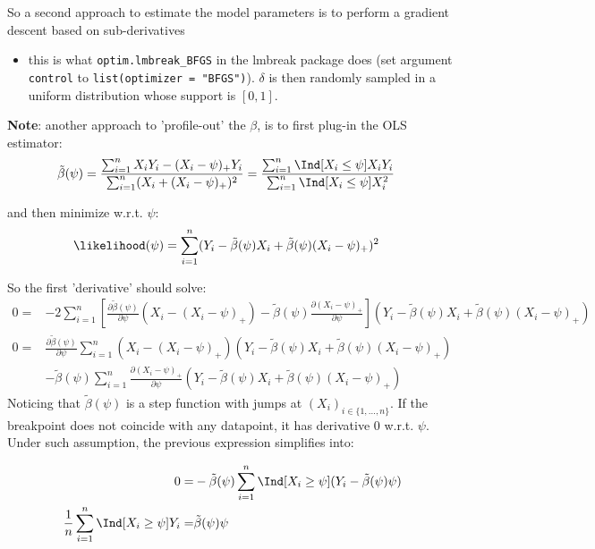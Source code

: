 \documentclass[12pt]{article}
\begin{document}
\bigskip

So a second approach to estimate the model parameters is to perform a
gradient descent based on sub-derivatives
\begin{itemize}
\item this is what \texttt{optim.lmbreak\_BFGS} in the lmbreak package does (set
argument \texttt{control} to \texttt{list(optimizer = "BFGS")}). \(\delta\) is then randomly
sampled in a uniform distribution whose support is \([0,1]\).
\end{itemize}

\clearpage


\noindent \textbf{Note}: another approach to 'profile-out' the \(\beta\), is to first
 plug-in the OLS estimator:
\begin{align*}
\tilde{\beta}(\psi) &= \frac{\sum_{i=1}^n X_i Y_i - (X_i - \psi)_+ Y_i}{\sum_{i=1}^n (X_i + (X_i - \psi)_+)^2} = \frac{\sum_{i=1}^n \Ind[X_i \leq \psi] X_i Y_i}{\sum_{i=1}^n \Ind[X_i \leq \psi] X^2_i} 
\end{align*}

and then minimize w.r.t. \(\psi\):
\begin{align*}
\likelihood(\psi) &= \sum_{i=1}^n (Y_i - \tilde{\beta}(\psi) X_i + \tilde{\beta}(\psi) (X_i - \psi)_+)^2
\end{align*}

So the first 'derivative' should solve:
\begin{align*}
0 =& -2 \sum_{i=1}^n \left[
  \frac{\partial \tilde{\beta}(\psi)}{\partial \psi} (X_i - (X_i - \psi)_+)
- \tilde{\beta}(\psi)\frac{\partial (X_i - \psi)_+}{\partial \psi}\right]
(Y_i - \tilde{\beta}(\psi) X_i + \tilde{\beta}(\psi)(X_i - \psi)_+ ) \\
0 =& \frac{\partial \tilde{\beta}(\psi)}{\partial \psi} \sum_{i=1}^n (X_i - (X_i - \psi)_+)(Y_i - \tilde{\beta}(\psi) X_i + \tilde{\beta}(\psi)(X_i - \psi)_+ ) \\
& - \tilde{\beta}(\psi)\sum_{i=1}^n\frac{\partial (X_i - \psi)_+}{\partial \psi}(Y_i - \tilde{\beta}(\psi) X_i + \tilde{\beta}(\psi)(X_i - \psi)_+ ) 
\end{align*}
Noticing that \(\tilde{\beta}(\psi)\) is a step function with jumps at
\((X_i)_{i\in\{1,\ldots,n\}}\). If the breakpoint does not coincide
with any datapoint, it has derivative 0 w.r.t. \(\psi\). Under such
assumption, the previous expression simplifies into:

\begin{align*}
0 =& - \tilde{\beta}(\psi)\sum_{i=1}^n \Ind[X_i \geq \psi] (Y_i - \tilde{\beta}(\psi) \psi)  \\
\frac{1}{n}\sum_{i=1}^n \Ind[X_i \geq \psi] Y_i =& \tilde{\beta}(\psi) \psi
\end{align*}
\end{document}
